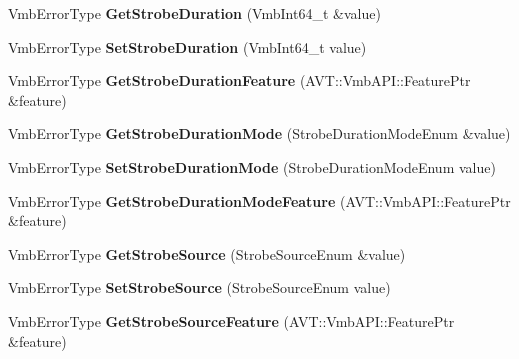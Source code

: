 \begin{DoxyCompactItemize}
\item 
\hypertarget{classMakoCamera_ac45f39a989d25c7a48422f8ac1a79e35}{Vmb\-Error\-Type {\bfseries Get\-Strobe\-Duration} (Vmb\-Int64\-\_\-t \&value)}\label{classMakoCamera_ac45f39a989d25c7a48422f8ac1a79e35}

\item 
\hypertarget{classMakoCamera_a0b426addfd5e43e40d6ed236252ae82e}{Vmb\-Error\-Type {\bfseries Set\-Strobe\-Duration} (Vmb\-Int64\-\_\-t value)}\label{classMakoCamera_a0b426addfd5e43e40d6ed236252ae82e}

\item 
\hypertarget{classMakoCamera_a16035badc74a0f8b7ca852419306a60a}{Vmb\-Error\-Type {\bfseries Get\-Strobe\-Duration\-Feature} (A\-V\-T\-::\-Vmb\-A\-P\-I\-::\-Feature\-Ptr \&feature)}\label{classMakoCamera_a16035badc74a0f8b7ca852419306a60a}

\item 
\hypertarget{classMakoCamera_a57f0528ea8bfbe0dad7526c4cc30d280}{Vmb\-Error\-Type {\bfseries Get\-Strobe\-Duration\-Mode} (Strobe\-Duration\-Mode\-Enum \&value)}\label{classMakoCamera_a57f0528ea8bfbe0dad7526c4cc30d280}

\item 
\hypertarget{classMakoCamera_ad3c1c9ad9fc44895f646341d9b35d722}{Vmb\-Error\-Type {\bfseries Set\-Strobe\-Duration\-Mode} (Strobe\-Duration\-Mode\-Enum value)}\label{classMakoCamera_ad3c1c9ad9fc44895f646341d9b35d722}

\item 
\hypertarget{classMakoCamera_ae8c2c3f22183f96c16820b7595681e12}{Vmb\-Error\-Type {\bfseries Get\-Strobe\-Duration\-Mode\-Feature} (A\-V\-T\-::\-Vmb\-A\-P\-I\-::\-Feature\-Ptr \&feature)}\label{classMakoCamera_ae8c2c3f22183f96c16820b7595681e12}

\item 
\hypertarget{classMakoCamera_a19c361580590703bda347d0d5883aee7}{Vmb\-Error\-Type {\bfseries Get\-Strobe\-Source} (Strobe\-Source\-Enum \&value)}\label{classMakoCamera_a19c361580590703bda347d0d5883aee7}

\item 
\hypertarget{classMakoCamera_a57547b0c9c721c111ba6877845ce7d62}{Vmb\-Error\-Type {\bfseries Set\-Strobe\-Source} (Strobe\-Source\-Enum value)}\label{classMakoCamera_a57547b0c9c721c111ba6877845ce7d62}

\item 
\hypertarget{classMakoCamera_a72d5ebc1952ed733caff80295a9af2b4}{Vmb\-Error\-Type {\bfseries Get\-Strobe\-Source\-Feature} (A\-V\-T\-::\-Vmb\-A\-P\-I\-::\-Feature\-Ptr \&feature)}\label{classMakoCamera_a72d5ebc1952ed733caff80295a9af2b4}


\end{DoxyCompactItemize}

